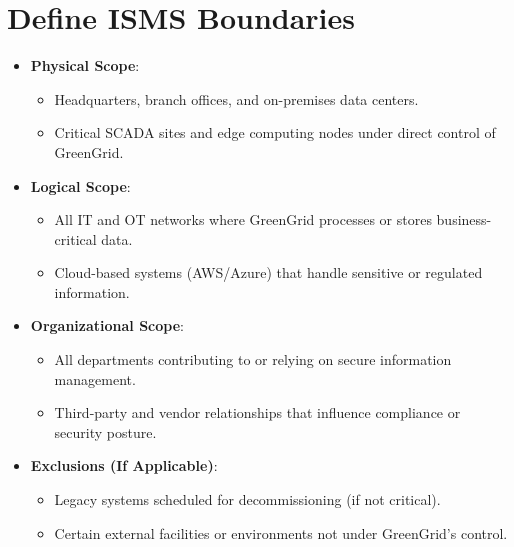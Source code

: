 \section{Define ISMS Boundaries}
\begin{itemize}
    \item \textbf{Physical Scope}:
    \begin{itemize}
        \item Headquarters, branch offices, and on-premises data centers.
        \item Critical SCADA sites and edge computing nodes under direct control of GreenGrid.
    \end{itemize}
    \item \textbf{Logical Scope}:
    \begin{itemize}
        \item All IT and OT networks where GreenGrid processes or stores business-critical data.
        \item Cloud-based systems (AWS/Azure) that handle sensitive or regulated information.
    \end{itemize}
    \item \textbf{Organizational Scope}:
    \begin{itemize}
        \item All departments contributing to or relying on secure information management.
        \item Third-party and vendor relationships that influence compliance or security posture.
    \end{itemize}
    \item \textbf{Exclusions (If Applicable)}:
    \begin{itemize}
        \item Legacy systems scheduled for decommissioning (if not critical).
        \item Certain external facilities or environments not under GreenGrid’s control.
    \end{itemize}
\end{itemize}

